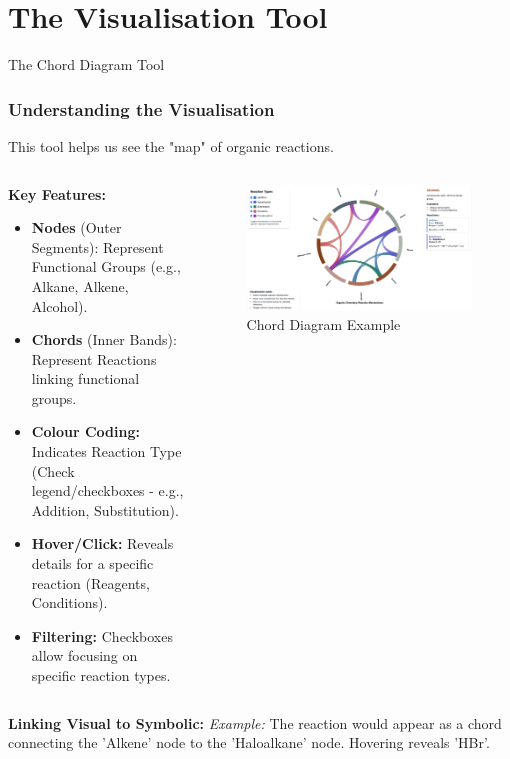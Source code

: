 \documentclass[xcolor=svgnames]{beamer}
\begin{document}
\section{The Visualisation Tool}
\begin{frame}{The Chord Diagram Tool}
    \frametitle{Understanding the Visualisation}
    This tool helps us see the "map" of organic reactions.
    \vspace{1em}
    \begin{columns}[T]
        \begin{column}{0.6\textwidth}
            \textbf{Key Features:}
            \begin{itemize}
                \item \textbf{Nodes} (Outer Segments): Represent Functional Groups (e.g., Alkane, Alkene, Alcohol).
                \item \textbf{Chords} (Inner Bands): Represent Reactions linking functional groups.
                \item \textbf{Colour Coding:} Indicates Reaction Type (Check legend/checkboxes - e.g., Addition, Substitution).
                \item \textbf{Hover/Click:} Reveals details for a specific reaction (Reagents, Conditions).
                \item \textbf{Filtering:} Checkboxes allow focusing on specific reaction types.
            \end{itemize}
        \end{column}
        \begin{column}{0.4\textwidth}
            \begin{figure}
                \includegraphics[width=\linewidth]{img/all-organic-chem.png}
                \caption{Chord Diagram Example}
            \end{figure}
        \end{column}
    \end{columns}
    \vspace{1em}
    \textbf{Linking Visual to Symbolic:}
    \textit{Example:} The reaction  would appear as a chord connecting the 'Alkene' node to the 'Haloalkane' node. Hovering reveals 'HBr'.
\end{frame}
\end{document}

